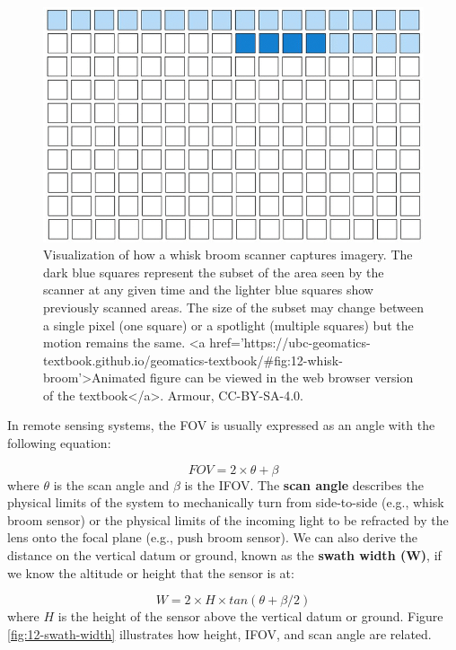 \documentclass[
]{book}
\begin{document}
\begin{figure}
\includegraphics[width=0.9\linewidth]{images/12-whisk-broom} \caption{Visualization of how a whisk broom scanner captures imagery. The dark blue squares represent the subset of the area seen by the scanner at any given time and the lighter blue squares show previously scanned areas. The size of the subset may change between a single pixel (one square) or a spotlight (multiple squares) but the motion remains the same. <a href='https://ubc-geomatics-textbook.github.io/geomatics-textbook/#fig:12-whisk-broom'>Animated figure can be viewed in the web browser version of the textbook</a>. Armour, CC-BY-SA-4.0.}\label{fig:12-whisk-broom}
\end{figure}

In remote sensing systems, the FOV is usually expressed as an angle with the following equation:

\[
FOV = 2 × θ + β
\]
where \(θ\) is the scan angle and \(β\) is the IFOV. The \textbf{scan angle} describes the physical limits of the system to mechanically turn from side-to-side (e.g., whisk broom sensor) or the physical limits of the incoming light to be refracted by the lens onto the focal plane (e.g., push broom sensor). We can also derive the distance on the vertical datum or ground, known as the \textbf{swath width (W)}, if we know the altitude or height that the sensor is at:

\[
W = 2 × H × tan(θ + β/2) 
\]
where \(H\) is the height of the sensor above the vertical datum or ground. Figure \ref{fig:12-swath-width} illustrates how height, IFOV, and scan angle are related.
\end{document}
